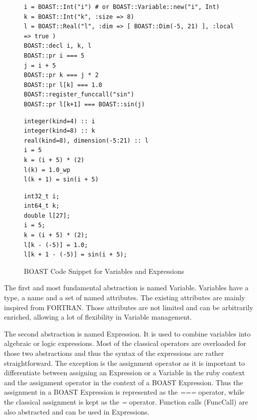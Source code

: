 \documentclass[review]{elsarticle}
\begin{document}
\begin{figure}
\begin{lstlisting}
i = BOAST::Int("i") # or BOAST::Variable::new("i", Int)
k = BOAST::Int("k", :size => 8)
l = BOAST::Real("l", :dim => [ BOAST::Dim(-5, 21) ], :local => true )
BOAST::decl i, k, l
BOAST::pr i === 5
j = i + 5
BOAST::pr k === j * 2
BOAST::pr l[k] === 1.0
BOAST::register_funccall("sin")
BOAST::pr l[k+1] === BOAST::sin(j)
\end{lstlisting}

\begin{minipage}[b]{0.50\linewidth}
\centering
{}

\begin{lstlisting}
integer(kind=4) :: i
integer(kind=8) :: k
real(kind=8), dimension(-5:21) :: l
i = 5
k = (i + 5) * (2)
l(k) = 1.0_wp
l(k + 1) = sin(i + 5)
\end{lstlisting}
\end{minipage}
\hspace{0.04\linewidth}
\begin{minipage}[b]{0.44\linewidth}
\centering
{}

\begin{lstlisting}
int32_t i;
int64_t k;
double l[27];
i = 5;
k = (i + 5) * (2);
l[k - (-5)] = 1.0;
l[k + 1 - (-5)] = sin(i + 5);
\end{lstlisting}
\end{minipage}
\caption{BOAST Code Snippet for Variables and Expressions}
\label{fig:BOAST_algebra}
\end{figure}
The first and most fundamental abstraction is named Variable. Variables have a
type, a name and a set of named attributes. The existing attributes are mainly
inspired from FORTRAN. Those attributes are not limited and can be arbitrarily
enriched, allowing a lot of flexibility in Variable management.

The second abstraction is named Expression. It is used to combine variables into
algebraic or logic expressions. Most of the classical operators are overloaded
for those two abstractions and thus the syntax of the expressions are rather
straightforward. The exception is the assignment operator as it is important to
differentiate between assigning an Expression or a Variable in the ruby context
and the assignment operator in the context of a BOAST Expression. Thus the
assignment in a BOAST Expression is represented as the \emph{===} operator,
while the classical assignment is kept as the \emph{=} operator. Function calls
(FuncCall) are also abstracted and can be used in Expressions.
\end{document}
